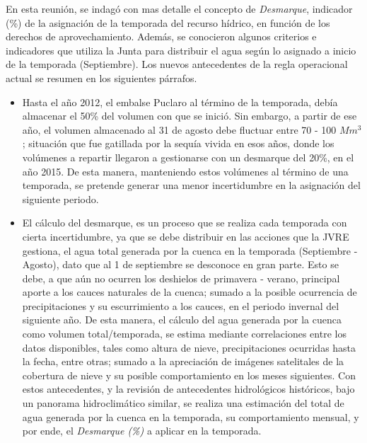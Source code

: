 \documentclass[11pt,]{article}
\begin{document}
		En esta reunión, se indagó con mas detalle el concepto de \textit {Desmarque}, indicador (\%) de la asignación de la temporada del recurso hídrico, en función de los derechos de aprovechamiento. Además, se conocieron algunos criterios e indicadores que utiliza la Junta para distribuir el agua según lo asignado a inicio de la temporada (Septiembre). Los nuevos antecedentes de la regla operacional actual se resumen en los siguientes párrafos.
		
		\begin{itemize}
		
		\item Hasta el año 2012, el embalse Puclaro al término de la temporada, debía almacenar el 50\% del volumen con que se inició. Sin embargo, a partir de ese año, el volumen almacenado al 31 de agosto debe fluctuar entre 70 - 100 $Mm^3$; situación que fue gatillada por la sequía vivida en esos años, donde los volúmenes a repartir llegaron a gestionarse con un desmarque del 20\%, en el año 2015. De esta manera, manteniendo estos volúmenes al término de una temporada, se pretende generar una menor incertidumbre en la asignación del siguiente periodo.
		
		\item El cálculo del desmarque, es un proceso que se realiza cada temporada con cierta incertidumbre, ya que se debe distribuir en las acciones que la JVRE gestiona, el agua total generada por la cuenca en la temporada (Septiembre - Agosto), dato que al 1 de septiembre se desconoce en gran parte. Esto se debe, a que aún no ocurren los deshielos de primavera - verano, principal aporte a los cauces naturales de la cuenca; sumado a la posible ocurrencia de precipitaciones y su escurrimiento a los cauces, en el periodo invernal del siguiente año. De esta manera, el cálculo del agua generada por la cuenca como volumen total/temporada, se estima mediante correlaciones entre los datos disponibles, tales como altura de nieve, precipitaciones ocurridas hasta la fecha, entre otras; sumado a la apreciación de imágenes satelitales de la cobertura de nieve y su posible comportamiento en los meses siguientes. Con estos antecedentes, y la revisión de antecedentes hidrológicos históricos, bajo un panorama hidroclimático similar, se realiza una estimación del total de agua generada por la cuenca en la temporada, su comportamiento mensual, y por ende, el \textit {Desmarque (\%)} a aplicar en la temporada.
		

\end{itemize}
\end{document}
